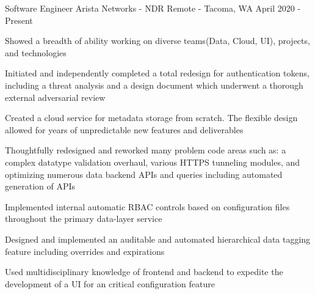 

\begin{cventries}

  \cventry
    {Software Engineer} %
    {Arista Networks - NDR} %
    {Remote - Tacoma, WA} %
    {April 2020 - Present} %
    {
      \begin{cvitems} %
        \item{Showed a breadth of ability working on diverse teams(Data, Cloud, UI), projects, and technologies}
 	\item{Initiated and independently completed a total redesign for authentication tokens, including a threat analysis and a design document which underwent a thorough external adversarial review}
 	\item{Created a cloud service for metadata storage from scratch. The flexible design allowed for years of unpredictable new features and deliverables}
	\item{Thoughtfully redesigned and reworked many problem code areas such as: a complex datatype validation overhaul, various HTTPS tunneling modules, and optimizing numerous data backend APIs and queries including automated generation of APIs}
 	\item{Implemented internal automatic RBAC controls based on configuration files throughout the primary data-layer service}
 	\item{Designed and implemented an auditable and automated hierarchical data tagging feature including overrides and expirations}
 	\item{Used multidisciplinary knowledge of frontend and backend to expedite the development of a UI for an critical configuration feature}
      \end{cvitems}
    }


\end{cventries}
